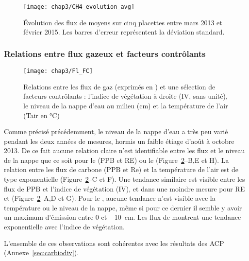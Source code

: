 \begin{figure}
\centering
\texttt{[image: chap3/CH4\_evolution\_avg]}
\caption{Évolution des flux de \chh moyens sur cinq placettes entre mars 2013 et février 2015. Les barres d'erreur représentent la déviation standard.}
\label{fig:CH4_evolution_avg}
\end{figure}



\subsubsection{Relations entre flux gazeux et facteurs contrôlants}

\begin{figure}[!htb]
\centering
\texttt{[image: chap3/Fl\_FC]}
\caption{Relations entre les flux de gaz (exprimés en \si{\uml}) et une sélection de facteurs contrôlants : l'indice de végétation à droite (IV, sans unité), le niveau de la nappe d'eau au milieu (cm) et la température de l'air (Tair en \si{\degreeCelsius})}
\label{fig:Fl_FC}
\end{figure}

Comme précisé précédemment, le niveau de la nappe d'eau a très peu varié pendant les deux années de mesures, hormis un faible étiage d'août à octobre 2013.
De ce fait aucune relation claire n'est identifiable entre les flux et le niveau de la nappe que ce soit pour le \coo (PPB et RE) ou le \chh (Figure~\ref{fig:Fl_FC}--B,E et H).
La relation entre les flux de carbone (PPB et Re) et la température de l'air est de type exponentielle (Figure~\ref{fig:Fl_FC}--C et F).
Une tendance similaire est visible entre les flux de PPB et l'indice de végétation (IV), et dans une moindre mesure pour RE et \chh (Figure~\ref{fig:Fl_FC}--A,D et G).
Pour le \chh, aucune tendance n'est visible avec la température ou le niveau de la nappe, même si pour ce dernier il semble y avoir un maximum d'émission entre 0 et \SI{-10}{\centi\metre}.
Les flux de \chh montrent une tendance exponentielle avec l'indice de végétation.

L'ensemble de ces observations sont cohérentes avec les résultats des ACP (Annexe~\ref{sec:carbiodiv}).


